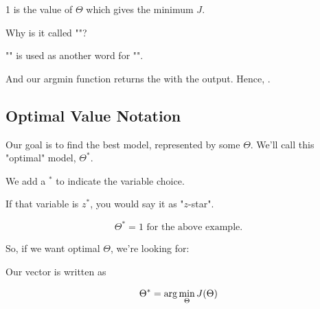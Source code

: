        1 is the value of $\Theta$ which gives the minimum $J$.\\

        \begin{clarification}
            Why is it called ""?

            "" is used as another word for "".

            And our argmin function returns the  with the  output. Hence,  .
        \end{clarification}
        
          

        

        \phantom{}
        
    \subsection{Optimal Value Notation}
        
        Our goal is to find the best model, represented by some $\Theta$. We'll call this "optimal" model, $\Theta^*$.\\
        
        \begin{notation}
            We add a  $^*$ to indicate the  variable choice.
            
            If that variable is $z^*$, you would say it as "$z$-star".
        \end{notation}
        
        \miniex 
        
        \begin{equation}
            \Theta^* = 1 \text{ for the above example.}
        \end{equation}
        
        So, if we want optimal $\Theta$, we're looking for:\\
        
        \begin{kequation}
        
            Our  vector is written as 
            
            \begin{equation*}
                \Theta^* = {\rm arg}\min_{ \Theta  }{  J(\Theta)  }
            \end{equation*}
        \end{kequation}
        


